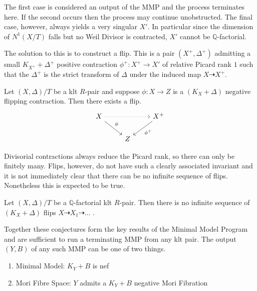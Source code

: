 The first case is considered an output of the MMP and the process terminates here. If the second occurs then the process may continue unobstructed. The final case, however, always yields a very singular $X'$. In particular since the dimension of $N^{1}(X/T)$ falls but no Weil Divisor is contracted, $X'$ cannot be $\mathbb{Q}$-factorial.

The solution to this is to construct a flip. This is a pair $(X^{+},\Delta^{+})$ admitting a small $K_{X^{+}} +\Delta^{+}$ positive contraction $\phi^{+}:X^{+} \to X'$ of relative Picard rank $1$ such that the $\Delta ^{+}$ is the strict transform of $\Delta$ under the induced map $X \dashrightarrow X^{+}$.

\begin{conjecture}\label{flips-conj}
	Let $(X,\Delta)/T$ be a klt $R$-pair and suppose $\phi:X \to Z$ is a $(K_{X}+\Delta)$ negative flipping contraction. Then there exists a flip. \[\begin{tikzcd}
	X \arrow[rr, dotted] \arrow[rd, "\phi"] &   & X^{+} \arrow[ld, "\phi^{+}"] \\
	& Z &                             
	\end{tikzcd}\]	
\end{conjecture}

Divisorial contractions always reduce the Picard rank, so there can only be finitely many. Flips, however, do not have such a clearly associated invariant and it is not immediately clear that there can be no infinite sequence of flips. Nonetheless this is expected to be true.

\begin{conjecture}
	
	Let $(X,\Delta)/T$ be a $\mathbb{Q}$-factorial klt $R$-pair. Then there is no infinite sequence of $(K_{X}+\Delta)$ flips $X \dashrightarrow X_{1} \dashrightarrow ...$ .
	
	\end{conjecture}

Together these conjectures form the key results of the Minimal Model Program and are sufficient to run a terminating MMP from any klt pair. The output $(Y,B)$ of any such MMP can be one of two things.

\begin{enumerate}
	\item Minimal Model: $K_{Y}+B$ is nef
	\item Mori Fibre Space: $Y$ admits a $K_{Y}+B$ negative Mori Fibration
\end{enumerate}

